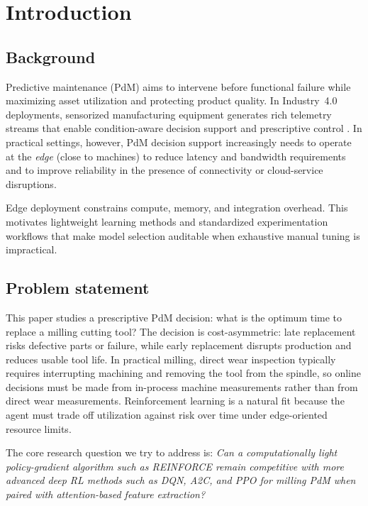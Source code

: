 \documentclass[sn-basic]{sn-jnl} %
\begin{document}
\maketitle

\section{Introduction}
\subsection{Background}
Predictive maintenance (PdM) aims to intervene before functional failure while maximizing asset utilization and protecting product quality. In Industry~4.0 deployments, sensorized manufacturing equipment generates rich telemetry streams that enable condition-aware decision support and prescriptive control \cite{Zonta2020, Compare2020}. In practical settings, however, PdM decision support increasingly needs to operate at the \emph{edge} (close to machines) to reduce latency and bandwidth requirements and to improve reliability in the presence of connectivity or cloud-service disruptions.

Edge deployment constrains compute, memory, and integration overhead. This motivates lightweight learning methods and standardized experimentation workflows that make model selection auditable when exhaustive manual tuning is impractical.

\subsection{Problem statement}
This paper studies a prescriptive PdM decision: what is the optimum time to replace a milling cutting tool? The decision is cost-asymmetric: late replacement risks defective parts or failure, while early replacement disrupts production and reduces usable tool life. In practical milling, direct wear inspection typically requires interrupting machining and removing the tool from the spindle, so online decisions must be made from in-process machine measurements rather than from direct wear measurements. Reinforcement learning is a natural fit because the agent must trade off utilization against risk over time under edge-oriented resource limits.

The core research question we try to address is: \emph{Can a computationally light policy-gradient algorithm such as \textsc{REINFORCE} remain competitive with more advanced deep RL methods such as \textsc{DQN}, \textsc{A2C}, and \textsc{PPO} for milling PdM when paired with attention-based feature extraction?}
\end{document}
